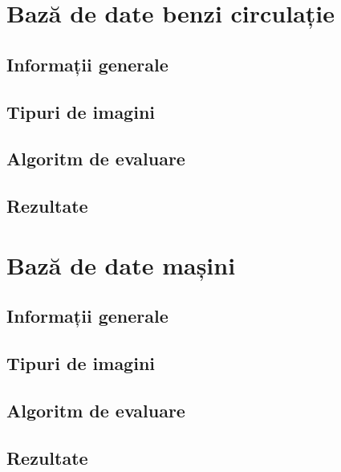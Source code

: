 \section{Bază de date benzi circulație}
\subsection{Informații generale}
\subsection{Tipuri de imagini}
\subsection{Algoritm de evaluare}
\subsection{Rezultate}

\section{Bază de date mașini}
\subsection{Informații generale}
\subsection{Tipuri de imagini}
\subsection{Algoritm de evaluare}
\subsection{Rezultate}